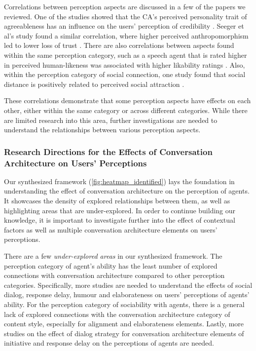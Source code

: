 Correlations between perception aspects are discussed in a few of the papers we reviewed. One of the studies showed that the CA's perceived personality trait of agreeableness has an influence on the users' perception of credibility \cite{andrews2012system}\cmt{[38]}. Seeger et al's study found a similar correlation, where higher perceived anthropomorphism led to lower loss of trust \cite{seeger2021chatbots}\cmt{[35]}. There are also correlations between aspects found within the same perception category, such as a speech agent that is rated higher in perceived human-likeness was associated with higher likability ratings \cite{zhu2022effects}\cmt{[26]}. Also, within the perception category of social connection, one study found that social distance is positively related to perceived social attraction \cite{westerman2019believe}\cmt{[9]}.
 
These correlations demonstrate that some perception aspects have effects on each other, either within the same category or across different categories. While there are limited research into this area, further investigations are needed to understand the relationships between various perception aspects.


\subsubsection{Research Directions for the Effects of Conversation Architecture on Users' Perceptions}

Our synthesized framework (\autoref{fig:heatmap_identified}) lays the foundation in understanding the effect of conversation architecture on the perception of agents. It showcases the density of explored relationships between them, as well as highlighting areas that are under-explored. In order to continue building our knowledge, it is important to investigate further into the effect of contextual factors as well as multiple conversation architecture elements on users' perceptions.

There are a few \textit{under-explored areas} in our synthesized framework. The perception category of agent's ability has the least number of explored connections with conversation architecture compared to other perception categories. Specifically, more studies are needed to understand the effects of social dialog, response delay, humour and elaborateness on users' perceptions of agents' ability. For the perception category of sociability with agents, there is a general lack of explored connections with the conversation architecture category of content style, especially for alignment and elaborateness elements. Lastly, more studies on the effect of dialog strategy for conversation architecture elements of initiative and response delay on the perceptions of agents are needed.

